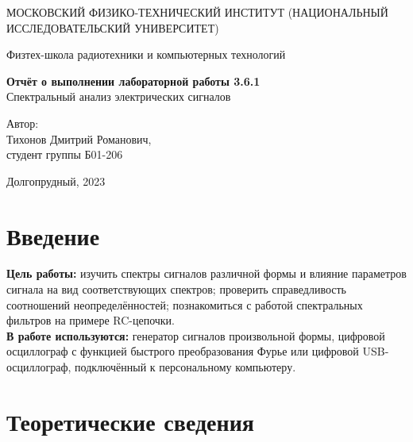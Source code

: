 \documentclass[a4paper, 12pt]{article}
\begin{document}
    \begin{titlepage}
	\begin{center}
            {\large МОСКОВСКИЙ ФИЗИКО-ТЕХНИЧЕСКИЙ ИНСТИТУТ (НАЦИОНАЛЬНЫЙ ИССЛЕДОВАТЕЛЬСКИЙ УНИВЕРСИТЕТ)}
	\end{center}
 
	\begin{center}
		{\large Физтех-школа радиотехники и компьютерных технологий}
	\end{center}
	
	\vspace{8cm}
	{\LARGE
		\begin{center}
                {\bf Отчёт о выполнении лабораторной работы 3.6.1}\\
                Спектральный анализ электрических сигналов
		\end{center}
	}
	\vspace{5cm}
	\begin{flushright}
		{\Large Автор:\\ Тихонов Дмитрий Романович, \\
			\vspace{0.2cm}
			студент группы Б01-206}
	\end{flushright}
	\vspace{5cm}
	\begin{center}
		\Large Долгопрудный, 2023
	\end{center}
    \end{titlepage}


    \section{Введение}

    \noindent \textbf{Цель работы:} изучить спектры сигналов различной формы и влияние параметров сигнала на вид соответствующих спектров; проверить справедливость соотношений неопределённостей; познакомиться с работой спектральных фильтров на примере RC-цепочки. \\

    \noindent \textbf{В работе используются:} генератор сигналов произвольной формы, цифровой осциллограф с функцией быстрого преобразования Фурье или цифровой USB-осциллограф, подключённый к персональному компьютеру.
    
    \section{Теоретические сведения}
    \label{theor}
\end{document}

